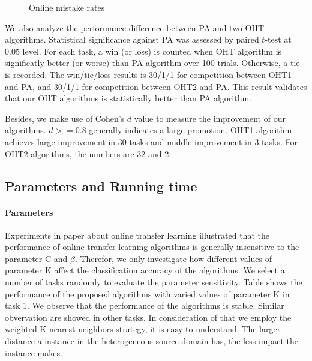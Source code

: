 \documentclass[twocolumn]{article}
\begin{document}
\begin{figure}[!htb]
\begin{center}
{  }
  \caption{Online mistake rates}
  \label{Online mistake rates}
\end{center}
\end{figure}

We also analyze the performance difference between PA and two OHT algorithms.
Statistical significance against PA was assessed by paired $t$-test at 0.05 level.
For each task, a win (or loss) is counted when OHT algorithm is significatly better (or worse) than PA algorithm over 100 trials.
Otherwise, a tie is recorded.
The win/tie/loss results is 30/1/1 for competition between OHT1 and PA, and 30/1/1 for competition between  OHT2 and PA.
This result validates that our OHT algorithms is statistically better than PA algorithm.

Besides, we make use of Cohen's $d$ value to measure the improvement of our algorithms.
$d >= 0.8$ generally indicates a large promotion.
OHT1 algorithm achieves large improvement in 30 tasks and middle improvement in 3 tasks.
For OHT2 algorithms, the numbers are 32 and 2.

\subsection{Parameters and Running time}
\paragraph{Parameters}
Experiments in paper about online transfer learning illustrated that the performance of online transfer learning algorithms is generally insensitive to the parameter C and $\beta$.
Therefor, we only investigate how different values of parameter K affect the classification accuracy of the algorithms.
We select a number of tasks randomly to evaluate the parameter sensitivity.
Table shows the performance of the proposed algorithms with varied values of parameter K in task 1.
We observe that the performance of the algorithms is stable.
Similar obvervation are showed in other tasks.
In consideration of that we employ the weighted K nearest neighbors strategy, it is easy to understand.
The larger distance a instance in the heterogeneous source domain has, the less impact the instance makes.
\end{document}
